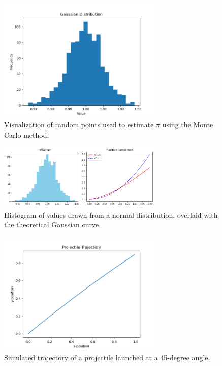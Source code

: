 \documentclass[12pt]{article}
\begin{document}
\begin{figure}[h!]
  \centering
  \includegraphics[width=0.7\textwidth]{../figures/Figure_2.png}
  \caption{Visualization of random points used to estimate $\pi$ using the Monte Carlo method.}
\end{figure}

\begin{figure}[h!]
  \centering
  \includegraphics[width=0.7\textwidth]{../figures/Figure_3.png}
  \caption{Histogram of values drawn from a normal distribution, overlaid with the theoretical Gaussian curve.}
\end{figure}

\begin{figure}[h!]
  \centering
  \includegraphics[width=0.7\textwidth]{../figures/Figure_4.png}
  \caption{Simulated trajectory of a projectile launched at a 45-degree angle.}
\end{figure}
\end{document}
